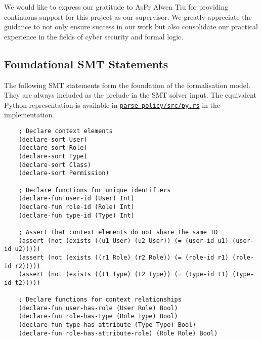 \documentclass[acmsmall,screen,nonacm]{acmart}
\begin{document}
\newpage

\begin{acks}
    We would like to express our gratitude to AsPr Alwen Tiu for providing 
continuous support for this project as our supervisor. We greatly appreciate 
the guidance to not only ensure success in our work but also consolidate our 
practical experience in the fields of cyber security and formal logic.
\end{acks}




\newpage

\begin{appendices}

\section{Foundational SMT Statements}
\label{appendix:formalisation}

The following SMT statements form the foundation of the formalisation model. 
They are always included as the prelude in the SMT solver input. The equivalent 
Python representation is available in 
\href{https://github.com/tsoutsman/comp2560/blob/main/parse-policy/src/py.rs}
{\texttt{parse-policy/src/py.rs}} in the implementation.

\bigskip

\begin{small}
\begin{verbatim}
    ; Declare context elements
    (declare-sort User)
    (declare-sort Role)
    (declare-sort Type)
    (declare-sort Class)
    (declare-sort Permission)

    ; Declare functions for unique identifiers
    (declare-fun user-id (User) Int)
    (declare-fun role-id (Role) Int)
    (declare-fun type-id (Type) Int)

    ; Assert that context elements do not share the same ID
    (assert (not (exists ((u1 User) (u2 User)) (= (user-id u1) (user-id u2)))))
    (assert (not (exists ((r1 Role) (r2 Role)) (= (role-id r1) (role-id r2)))))
    (assert (not (exists ((t1 Type) (t2 Type)) (= (type-id t1) (type-id t2)))))

    ; Declare functions for context relationships
    (declare-fun user-has-role (User Role) Bool)
    (declare-fun role-has-type (Role Type) Bool)
    (declare-fun type-has-attribute (Type Type) Bool)
    (declare-fun role-has-attribute-role) (Role Role) Bool)


\end{verbatim}
\end{small}
\end{appendices}
\end{document}
